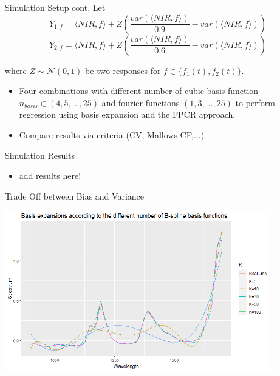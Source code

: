 \documentclass{beamer}
\begin{document}
	
	\begin{frame}{Simulation Setup cont.}
		Let 
		$$Y_{1,f} = \langle NIR, f\rangle + Z\left(  \frac{var(\langle NIR, f\rangle)}{0.9} - var(\langle NIR, f\rangle)\right)$$ 
		$$Y_{2,f} = \langle NIR, f\rangle + Z\left( \frac{var(\langle NIR, f\rangle)}{0.6} - var(\langle NIR, f\rangle)\right)$$
		
		where $Z \sim \mathcal{N}(0,1)$ be two responses for $f \in \{f_1(t), f_2(t)\}$.	
		\begin{itemize}
    		\item Four combinations with different number of cubic basis-function $n_{basis} \in (4,5,...,25)$ and fourier functions $(1,3,...,25)$ to perform regression using basis expansion and the FPCR approach.
			\item Compare results via criteria (CV, Mallows CP,...)
		
		\end{itemize}
	\end{frame}
	
	
	\begin{frame}{Simulation Results}
		
		\begin{itemize}
    		
			\item {\color{green} add results here!}
		\end{itemize}
	\end{frame}
	
	\begin{frame}{Trade Off between Bias and Variance}
		\begin{minipage}[t]{\textwidth}
			\includegraphics[height = 7cm]{../Graphics/Tradeoff.png}
		\end{minipage}
	\end{frame}

	
	
\end{document}
